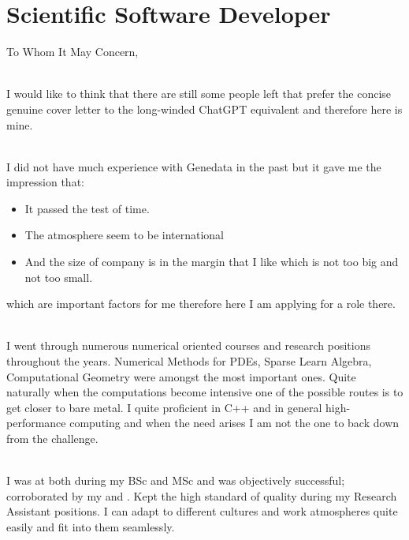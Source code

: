 \section{Scientific Software Developer}
To Whom It May Concern,

\\
I would like to think that there are still some people left that prefer the concise genuine cover letter to the long-winded ChatGPT equivalent and therefore here is mine.

\\
I did not have much experience with Genedata in the past but it gave me the impression that:
\begin{itemize}
    \item It passed the test of time.
    \item The atmosphere seem to be international
    \item And the size of company is in the margin that I like which is not too big and not too small.
\end{itemize} 
which are important factors for me therefore here I am applying for a role there.

\\
I went through numerous numerical oriented courses and research positions throughout the years. Numerical Methods for PDEs, Sparse Learn Algebra, Computational Geometry were amongst the most important ones. 
Quite naturally when the computations become intensive one of the possible routes is to get closer to bare metal. I quite proficient in C++ and in general high-performance computing and 
when the need arises I am not the one to back down from the challenge. 

\\
I was at  both during my BSc and MSc and was 
objectively successful; corroborated by my  and 
. Kept the high standard of quality 
during my Research Assistant positions. I can adapt to different 
cultures and work atmospheres quite easily and fit into them seamlessly.
